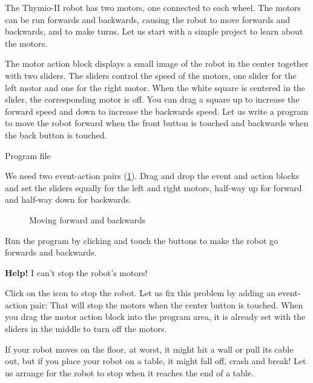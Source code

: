 \label{c.moving}


The Thymio-II robot has two motors, one connected to each wheel. The
motors can be run forwards and backwards, causing the robot to move
forwards and backwards, and to make turns. Let us start with a simple
project to learn about the motors.

The motor action block  displays a small image of the
robot in the center together with two sliders. The sliders control the
speed of the motors, one slider for the left motor and one for the right
motor. When the white square is centered in the slider, the
corresponding motor is off. You can drag a square up to increase the
forward speed and down to increase the backwards speed.
Let us write a program to move the robot forward when the front button
is touched and backwards when the back button is touched.

{\raggedleft \hfill Program file }

We need two event-action pairs (\cref{fig.nostop}). Drag and drop
the event and action blocks and set the sliders equally for the left and
right motors, half-way up for forward and half-way down for backwards.

\begin{figure}
\begin{center}
\caption{Moving forward and backwards}\label{fig.nostop}
\end{center}
\end{figure}

Run the program by clicking  and touch the buttons to
make the robot go forwards and backwards.

\newpage


\textbf{Help!} I can't stop the robot's motors!

Click on the icon  to stop the robot.
Let us fix this problem by adding an event-action pair: 
That will stop the motors when the center button is touched. When you
drag the motor action block into the program area, it is already set
with the sliders in the middle to turn off the motors.


If your robot moves on the floor, at worst, it might hit a wall or pull
its cable out, but if you place your robot on a table, it might fall
off, crash and break! Let us arrange for the robot to stop when it
reaches the end of a table.


